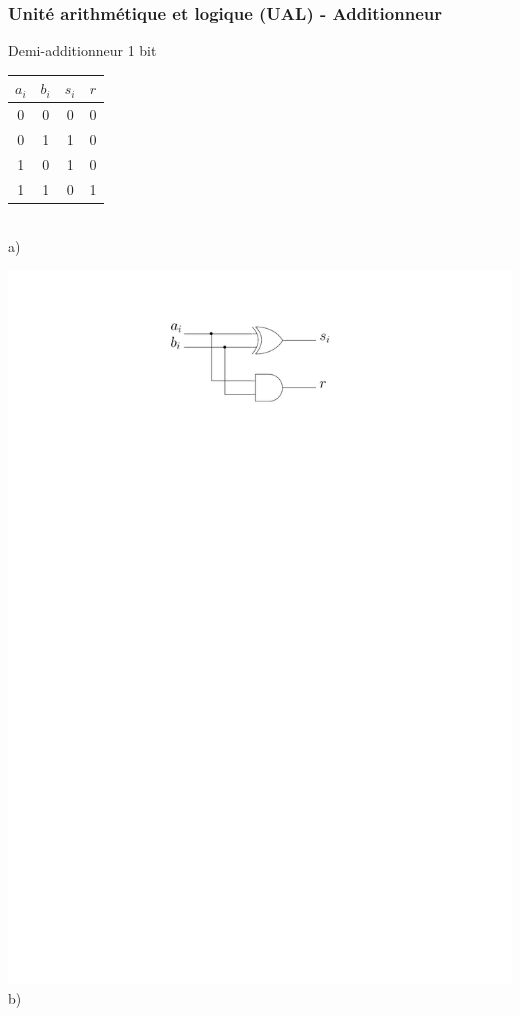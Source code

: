 \documentclass{beamer}
\begin{document}
\begin{frame}
\frametitle{Unité arithmétique et logique (UAL) - Additionneur}
\begin{block}{Demi-additionneur 1 bit}
   \begin{minipage}[c]{.46\linewidth}
\begin{tabular}{cc|cc}
$a_i$ & $b_i$ & $s_i$ & $r$\\
\hline
0 & 0 & 0 & 0\\
0 & 1 & 1 & 0\\
1 & 0 & 1 & 0\\
1 & 1 & 0 & 1
\end{tabular}\\\centering a)
   \end{minipage} \hfill
   \begin{minipage}[c]{.46\linewidth}
\includegraphics[width=\columnwidth]{Figs/half_adder.pdf}\\\centering b)
   \end{minipage}
\end{block}
\end{frame}
\end{document}
